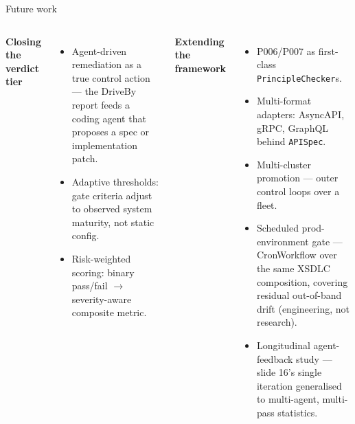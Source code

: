 \documentclass[11pt,aspectratio=169]{beamer}
\begin{document}
\begin{frame}{Future work}

\footnotesize

\begin{columns}[T,onlytextwidth]

\textbf{\textcolor{sdtblue}{Closing the verdict tier}}\\[0.15em]
\begin{itemize}\setlength\itemsep{0.15em}
\item Agent-driven remediation as a true control action ---
  the DriveBy report feeds a coding agent that proposes a spec or
  implementation patch.
\item Adaptive thresholds: gate criteria adjust to observed system
  maturity, not static config.
\item Risk-weighted scoring: binary pass/fail $\to$ severity-aware
  composite metric.
\end{itemize}

\textbf{\textcolor{sdtblue}{Extending the framework}}\\[0.15em]
\begin{itemize}\setlength\itemsep{0.15em}
\item P006/P007 as first-class \texttt{PrincipleChecker}s.
\item Multi-format adapters: AsyncAPI, gRPC, GraphQL behind \texttt{APISpec}.
\item Multi-cluster promotion --- outer control loops over a fleet.
\item Scheduled prod-environment gate --- CronWorkflow over the same XSDLC
  composition, covering residual out-of-band drift (engineering, not research).
\item Longitudinal agent-feedback study --- slide 16's single iteration
  generalised to multi-agent, multi-pass statistics.
\end{itemize}

\end{columns}

\end{frame}
\end{document}
